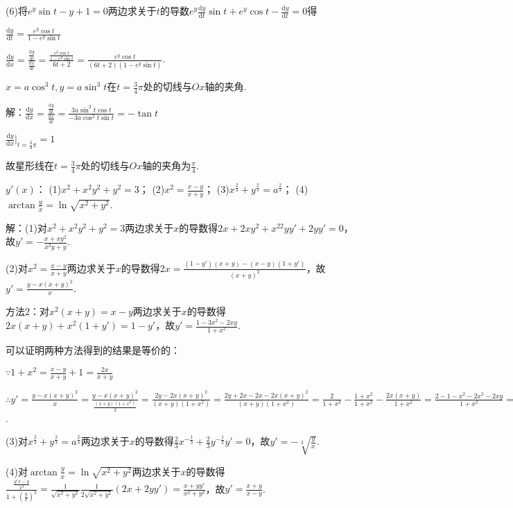 \documentclass[12pt,UTF8]{ctexart}
\begin{document}
\begin{enumerate}
(6)将$e^y\sin t-y+1=0$两边求关于$t$的导数$e^y\frac{\mathrm dy}{\mathrm dt}\sin t+e^y\cos t-\frac{\mathrm dy}{\mathrm dt}=0$得

$\frac{\mathrm dy}{\mathrm dt}=\frac{e^y\cos t}{1-e^y\sin t}$

$\frac{\mathrm dy}{\mathrm dx}=\frac{\frac{\mathrm dy}{\mathrm dt}}{\frac{\mathrm dx}{\mathrm dt}}=\frac{\frac{e^y\cos t}{1-e^y\sin t}}{6t+2}=\frac{e^y\cos t}{(6t+2)(1-e^y\sin t)}$.

$x=a\cos^3t,y=a\sin^3t$在$t=\frac34\pi$处的切线与$Ox$轴的夹角.

解：$\frac{\mathrm dy}{\mathrm dx}=\frac{\frac{\mathrm dy}{\mathrm dt}}{\frac{\mathrm dx}{\mathrm dt}}=\frac{3a\sin^2t\cos t}{-3a\cos^2t\sin t}=-\tan t$

$\frac{\mathrm dy}{\mathrm dx}|_{t=\frac34\pi}=1$

故星形线在$t=\frac34\pi$处的切线与$Ox$轴的夹角为$\frac\pi4$.

$y'(x)$：
\newline
(1)$x^2+x^2y^2+y^2=3$；
\newline
(2)$x^2=\frac{x-y}{x+y}$；
\newline
(3)$x^{\frac23}+y^{\frac23}=a^{\frac23}$；
\newline
(4)$\arctan\frac yx=\ln\sqrt{x^2+y^2}$.

解：(1)对$x^2+x^2y^2+y^2=3$两边求关于$x$的导数得$2x+2xy^2+x^22yy'+2yy'=0$，故$y'=-\frac{x+xy^2}{x^2y+y}$.

(2)对$x^2=\frac{x-y}{x+y}$两边求关于$x$的导数得$2x=\frac{(1-y')(x+y)-(x-y)(1+y')}{(x+y)^2}$，故$y'=\frac{y-x(x+y)^2}x$.

方法2：对$x^2(x+y)=x-y$两边求关于$x$的导数得$2x(x+y)+x^2(1+y')=1-y'$，故$y'=\frac{1-3x^2-2xy}{1+x^2}$.

可以证明两种方法得到的结果是等价的：

$\because 1+x^2=\frac{x-y}{x+y}+1=\frac{2x}{x+y}$

$\therefore y'=\frac{y-x(x+y)^2}x=\frac{y-x(x+y)^2}{\frac{(x+y)(1+x^2)}2}=\frac{2y-2x(x+y)^2}{(x+y)(1+x^2)}=\frac{2y+2x-2x-2x(x+y)^2}{(x+y)(1+x^2)}=\frac2{1+x^2}-\frac{1+x^2}{1+x^2}-\frac{2x(x+y)}{1+x^2}=\frac{2-1-x^2-2x^2-2xy}{1+x^2}=\frac{1-3x^2-2xy}{1+x^2}$.

(3)对$x^{\frac23}+y^{\frac23}=a^{\frac23}$两边求关于$x$的导数得$\frac23x^{-\frac13}+\frac23y^{-\frac13}y'=0$，故$y'=-\sqrt[3]{\frac yx}$.

(4)对$\arctan\frac yx=\ln\sqrt{x^2+y^2}$两边求关于$x$的导数得$\frac{\frac{y'x-y}{x^2}}{1+(\frac yx)^2}=\frac1{\sqrt{x^2+y^2}}\frac1{2\sqrt{x^2+y^2}}(2x+2yy')=\frac{x+yy'}{x^2+y^2}$，故$y'=\frac{x+y}{x-y}$.


\end{enumerate}
\end{document}

